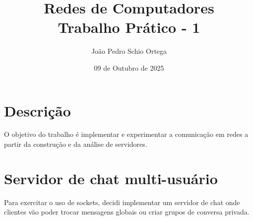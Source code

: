 \documentclass{article}
\title{Redes de Computadores \\ Trabalho Prático - 1}
\author{João Pedro Schio Ortega}
\date{09 de Outubro de 2025}
\begin{document}
\maketitle

\section{Descrição}
{
    O objetivo do trabalho é implementar e experimentar a comunicação em redes a partir da construção e da análise de servidores.

}

\section{Servidor de chat multi-usuário}
{
    Para exercitar o uso de sockets, decidi implementar um servidor de chat onde clientes vão poder trocar mensagens globais ou criar grupos de conversa privada.
}
\end{document}
